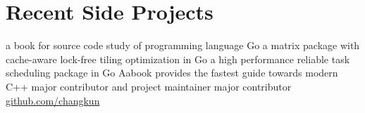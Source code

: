 \section{\textbf{Recent Side Projects}}
  \resumeSubHeadingListStart
      {a book for source code study of programming language Go}
      {a matrix package with cache-aware lock-free tiling optimization in Go}
      {a high performance reliable task scheduling package in Go}
      {Aabook provides the fastest guide towards modern C++}
      {major contributor and project maintainer}
      {major contributor}
      {\href{https://github.com/changkun/}{github.com/changkun}}
  \resumeSubHeadingListEnd
